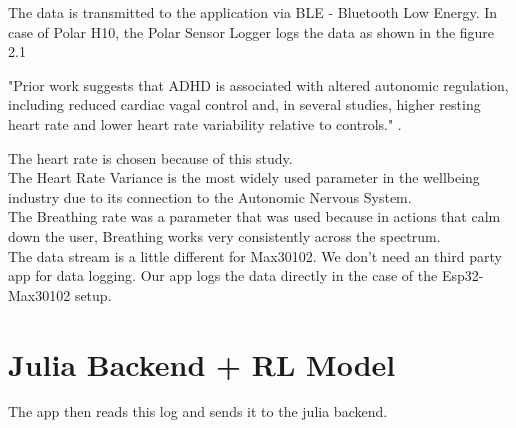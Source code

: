\documentclass[
	fontsize=15pt,
	twoside=false,
	secnumdepth=2
]{kaobook}
\begin{document}
The data is transmitted to the application via BLE - Bluetooth Low Energy. In case of Polar H10, the Polar Sensor Logger logs the data as shown in the figure 2.1 \\

\begin{displayquote}
\textcolor{Sepia}{"Prior work suggests that ADHD is associated with altered autonomic regulation, including reduced cardiac vagal control and, in several studies, higher resting heart rate and lower heart rate variability relative to controls."} .
\end{displayquote}

The heart rate is chosen because of this study. \\

The Heart Rate Variance is the most widely used parameter in the wellbeing industry due to its connection to the Autonomic Nervous System. \\

The Breathing rate was a parameter that was used because in actions that calm down the user, Breathing works very consistently across the spectrum. \\

The data stream is a little different for Max30102. We don't need an third party app for data logging. Our app logs the data directly in the case of the Esp32-Max30102 setup.\\

\section{Julia Backend + RL Model}

The app then reads this log and sends it to the julia backend. 
\end{document}
